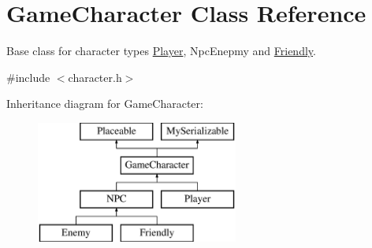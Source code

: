 \hypertarget{class_game_character}{}\section{Game\+Character Class Reference}
\label{class_game_character}


Base class for character types \hyperlink{class_player}{Player}, Npc\+Enepmy and \hyperlink{class_friendly}{Friendly}.  




{\ttfamily \#include $<$character.\+h$>$}

Inheritance diagram for Game\+Character\+:\begin{figure}[H]
\begin{center}
\leavevmode
\includegraphics[height=4.000000cm]{class_game_character}
\end{center}
\end{figure}
